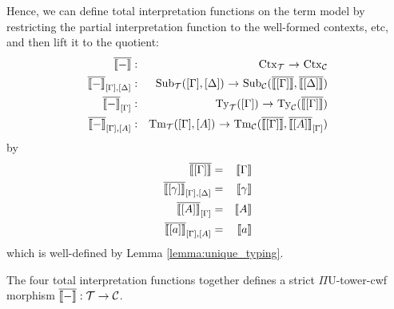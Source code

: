 \documentclass{lmcs}
\def\UU{\mathrm{U}}
\begin{document}

%

Hence, we can define total interpretation functions on the term model by restricting the partial 
interpretation function to the well-formed contexts, etc, and then lift it to the quotient:
\begin{eqnarray*}
\iniCtx{-} &:& \Ctx_\T\ \arrow\ \Ctx_\C\\
\iniSub{[\Gamma]}{[\Delta]}{-} &:&
 \Sub_\T([\Gamma],{[\Delta]}) \ \arrow \
 \Sub_\C(\iniCtx{[\Gamma]},{\iniCtx{[\Delta]}})\\
\iniTy{[\Gamma]}{-} &:& \Ty_\T([\Gamma])\ \arrow\ \Ty_\C(\iniCtx{[\Gamma]})\\
\iniTm{[\Gamma]}{[A]}{-} &:& \Tm_\T([\Gamma],[A])\ \arrow\ \Tm_\C(\iniCtx{[\Gamma]},\iniTy{[\Gamma]}{[A]})
\end{eqnarray*}
by
\begin{eqnarray*}
\iniCtx{[\Gamma]} &=& \inte{\Gamma}\\
\iniSub{[\Gamma]}{[\Delta]}{[\gamma]} &=& \inte{\gamma}\\
\iniTy{[\Gamma]}{[A]} &=& \inte{A}\\
\iniTm{[\Gamma]}{[A]}{[a]} &=& \inte{a}
\end{eqnarray*}
which is well-defined by Lemma \ref{lemma:unique_typing}.

The four total interpretation functions together defines a strict $\Pi\UU$-tower-cwf
morphism $\iniCtx{-} :\T  \rightarrow  \C$.
\end{document}
